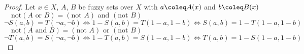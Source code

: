 \begin{proof}
  Let $x\in X$, $A$, $B$ be fuzzy sets over $X$ with $a \coleq A(x)$ and $b \coleq B(x)$\\

  $\quad \boxed{\text{not}(A \text{ or } B) = (\text{not } A) \text{ and } (\text{not } B)}$\\
  [0.5em]
  $\lnot S(a,b) = T(\lnot a, \lnot b) \iff 1 - S(a,b) = T(1-a, 1-b) \iff S(a,b) = 1 - T(1-a, 1-b)$\\

  $\quad \boxed{\text{not}(A \text{ and } B) = (\text{not } A) \text{ or } (\text{not } B)}$\\
  [0.5em]
  $\lnot T(a,b) = S(\lnot a, \lnot b) \iff 1 - T(a,b) = S(1-a, 1-b) \iff T(a,b) = 1 - S(1-a, 1-b)$

\end{proof}









